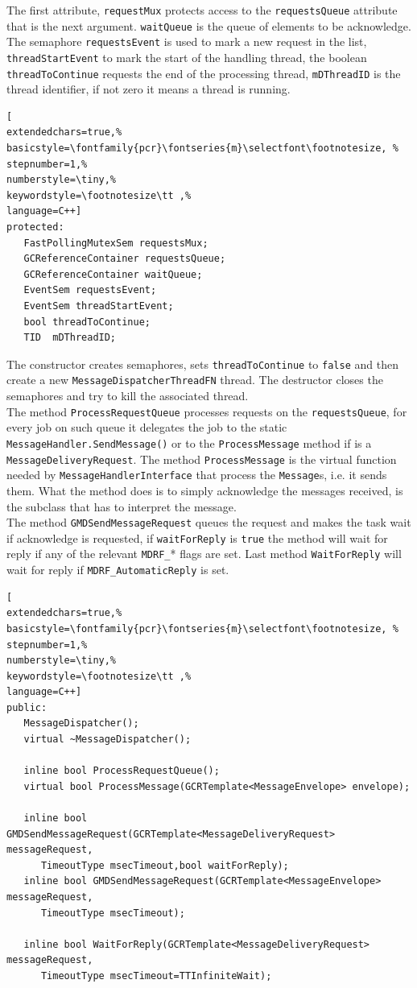 The first attribute, \texttt{requestMux} protects access to the \texttt{requestsQueue} attribute that is the next argument. \texttt{waitQueue} is the queue of elements to be acknowledge. The semaphore \texttt{requestsEvent} is used to mark a new request in the list, \texttt{threadStartEvent} to mark the start of the handling thread, the boolean \texttt{threadToContinue} requests the end of the processing thread, \texttt{mDThreadID} is the thread identifier, if not zero it means a thread is running.
\begin{lstlisting}[
extendedchars=true,%
basicstyle=\fontfamily{pcr}\fontseries{m}\selectfont\footnotesize, %
stepnumber=1,%
numberstyle=\tiny,%
keywordstyle=\footnotesize\tt ,%
language=C++]
protected:
   FastPollingMutexSem requestsMux;
   GCReferenceContainer requestsQueue;
   GCReferenceContainer waitQueue;
   EventSem requestsEvent;
   EventSem threadStartEvent;
   bool threadToContinue;
   TID  mDThreadID;
\end{lstlisting}

The constructor creates semaphores, sets \texttt{threadToContinue} to \texttt{false} and then create a new \texttt{MessageDispatcherThreadFN} thread. The destructor closes the semaphores and try to kill the associated thread. \\


The method \texttt{ProcessRequestQueue} processes requests on the \texttt{requestsQueue}, for every job on such queue it delegates the job to the static \texttt{MessageHandler.SendMessage()} or to the \texttt{ProcessMessage} method if is a \texttt{MessageDeliveryRequest}.
The method \texttt{ProcessMessage} is the virtual function needed by \texttt{MessageHandlerInterface} that process the \texttt{Message}s, i.e. it sends them. What the method does is to simply acknowledge the messages received, is the subclass that has to interpret the message.\\


The method \texttt{GMDSendMessageRequest} queues the request and makes the task wait if acknowledge is requested, if \texttt{waitForReply} is \texttt{true} the method will wait for reply if any of the relevant \texttt{MDRF\_}* flags are set. Last method \texttt{WaitForReply} will wait for reply if \texttt{MDRF\_AutomaticReply} is set.
\begin{lstlisting}[
extendedchars=true,%
basicstyle=\fontfamily{pcr}\fontseries{m}\selectfont\footnotesize, %
stepnumber=1,%
numberstyle=\tiny,%
keywordstyle=\footnotesize\tt ,%
language=C++]
public:
   MessageDispatcher();
   virtual ~MessageDispatcher();

   inline bool ProcessRequestQueue();
   virtual bool ProcessMessage(GCRTemplate<MessageEnvelope> envelope);

   inline bool GMDSendMessageRequest(GCRTemplate<MessageDeliveryRequest> messageRequest,
      TimeoutType msecTimeout,bool waitForReply);
   inline bool GMDSendMessageRequest(GCRTemplate<MessageEnvelope> messageRequest,
      TimeoutType msecTimeout);

   inline bool WaitForReply(GCRTemplate<MessageDeliveryRequest> messageRequest,
      TimeoutType msecTimeout=TTInfiniteWait);
\end{lstlisting}



